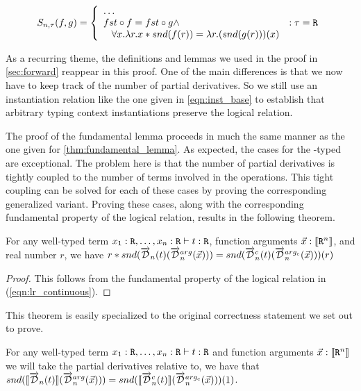   \begin{equation}
    S_{n, \tau}(f, g) =
      \left\{
        \begin{array}{ll}
          \dots \\
          fst \circ f = fst \circ g \wedge
            & : \tau = \texttt{R} \\
          \;\;\;\forall x. \lambda r. x * snd(f(r)) = \lambda r. (snd(g(r)))(x)
        \end{array}
      \right.
  \label{eqn:lr_continuous}
  \end{equation}

  As a recurring theme, the definitions and lemmas we used in the proof in \cref{sec:forward} reappear in this proof.
  One of the main differences is that we now have to keep track of the number of partial derivatives.
  So we still use an instantiation relation like the one given in \cref{eqn:inst_base} to establish that arbitrary typing context instantiations preserve the logical relation.

  The proof of the fundamental lemma proceeds in much the same manner as the one given for \cref{thm:fundamental_lemma}.
  As expected, the cases for the \synR-typed are exceptional.
  The problem here is that the number of partial derivatives is tightly coupled to the number of terms involved in the operations.
  This tight coupling can be solved for each of these cases by proving the corresponding generalized variant.
  Proving these cases, along with the corresponding fundamental property of the logical relation, results in the following theorem.

  \begin{theorem}[Duality]
    For any well-typed term $x_1 : \texttt{R}, \dots, x_n : \texttt{R} \vdash t : \texttt{R}$, function arguments $\vec{x} : \llbracket \texttt{R}^n \rrbracket$, and real number $r$, we have $r * snd(\overrightarrow{\mathcal{D}}_n(t)(\overrightarrow{\mathcal{D}}^{arg}_n(\vec{x}))) = snd(\overrightarrow{\mathcal{D}}^c_n(t)(\overrightarrow{\mathcal{D}}^{arg_c}_n(\vec{x})))(r)$
  \end{theorem}
  \begin{proof}
    This follows from the fundamental property of the logical relation in (\cref{eqn:lr_continuous}).
  \end{proof}

  This theorem is easily specialized to the original correctness statement we set out to prove.
  \begin{corollary}
    For any well-typed term $x_1 : \texttt{R}, \dots, x_n : \texttt{R} \vdash t : \texttt{R}$ and function arguments $\vec{x} : \llbracket \texttt{R}^n \rrbracket$ we will take the partial derivatives relative to, we have that $snd(\llbracket\overrightarrow{\mathcal{D}}_n(t)\rrbracket (\overrightarrow{\mathcal{D}}^{arg}_n(\vec{x}))) = snd(\llbracket\overrightarrow{\mathcal{D}}^c_n(t)\rrbracket (\overrightarrow{\mathcal{D}}^{arg_c}_n(\vec{x})))(1)$.
  \end{corollary}
